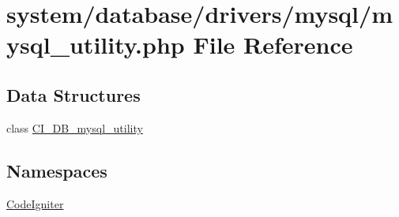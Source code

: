 \hypertarget{mysql__utility_8php}{}\section{system/database/drivers/mysql/mysql\+\_\+utility.php File Reference}
\label{mysql__utility_8php}
\subsection*{Data Structures}
\begin{DoxyCompactItemize}
\item 
class \mbox{\hyperlink{class_c_i___d_b__mysql__utility}{C\+I\+\_\+\+D\+B\+\_\+mysql\+\_\+utility}}
\end{DoxyCompactItemize}
\subsection*{Namespaces}
\begin{DoxyCompactItemize}
\item 
 \mbox{\hyperlink{namespace_code_igniter}{Code\+Igniter}}
\end{DoxyCompactItemize}
